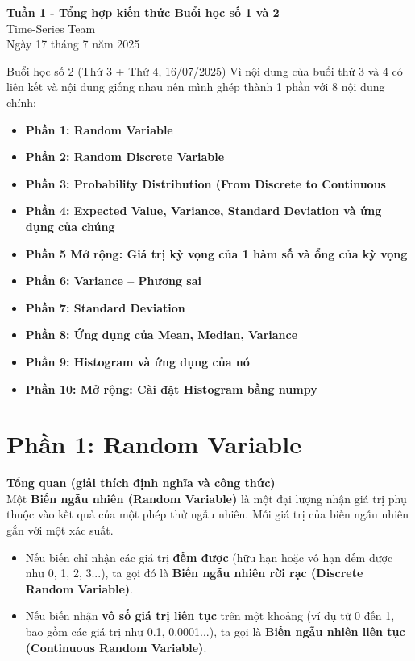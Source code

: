 \documentclass[11pt]{article}
\renewcommand{\maketitle}{%
    \begin{center}
        \fontsize{18}{20}\selectfont\textbf{Tuần 1 - Tổng hợp kiến thức Buổi học số 1 và 2}\\[1em]
        \fontsize{14}{16}\selectfont Time-Series Team\\[0.5em]
        \fontsize{14}{16}\selectfont Ngày 17 tháng 7 năm 2025
    \end{center}
    \vspace{1.5em} %
}
\begin{document}
\maketitle %

\begin{summarybox}
    Buổi học số 2 (Thứ 3 + Thứ 4, 16/07/2025) Vì nội dung của buổi thứ 3 và 4 có liên kết và nội dung giống nhau nên mình ghép thành 1 phần với 8 nội dung chính:
    \begin{itemize}
        \item \textbf{Phần 1: Random Variable}
        \item \textbf{Phần 2: Random Discrete Variable}
        \item \textbf{Phần 3: Probability Distribution (From Discrete to Continuous}
	\item \textbf{Phần 4: Expected Value, Variance, Standard Deviation và ứng dụng của chúng}
	\item \textbf{Phần 5 Mở rộng: Giá trị kỳ vọng của 1 hàm số và ổng của kỳ vọng}
	\item \textbf{Phần 6: Variance – Phương sai}
	\item \textbf{Phần 7: Standard Deviation}
	\item \textbf{Phần 8: Ứng dụng của Mean, Median, Variance}
	\item \textbf{Phần 9: Histogram và ứng dụng của nó}
	\item \textbf{Phần 10: Mở rộng: Cài đặt Histogram bằng numpy}
    \end{itemize}
\end{summarybox}

\newpage
\section{Phần 1: Random Variable}
\textbf{Tổng quan (giải thích định nghĩa và công thức)} \\

Một \textbf{Biến ngẫu nhiên (Random Variable)} là một đại lượng nhận giá trị phụ thuộc vào kết quả của một phép thử ngẫu nhiên. Mỗi giá trị của biến ngẫu nhiên gắn với một xác suất.

\begin{itemize}
    \item Nếu biến chỉ nhận các giá trị \textbf{đếm được} (hữu hạn hoặc vô hạn đếm được như 0, 1, 2, 3...), ta gọi đó là \textbf{Biến ngẫu nhiên rời rạc (Discrete Random Variable)}.
    \item Nếu biến nhận \textbf{vô số giá trị liên tục} trên một khoảng (ví dụ từ 0 đến 1, bao gồm các giá trị như 0.1, 0.0001...), ta gọi là \textbf{Biến ngẫu nhiên liên tục (Continuous Random Variable)}.
\end{itemize}
\end{document}

